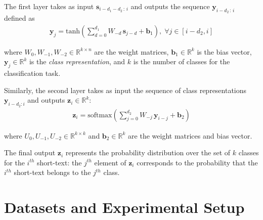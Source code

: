 \documentclass[11pt,letterpaper]{article}
\begin{document}
The first layer takes as input
$\mathbf{s}_{i-d_1-d_2 \, : \, i}$ 
and outputs the sequence
$\mathbf{y}_{i-d_2\,:\,i}$ defined as
\vspace{-0.2cm}
\begin{align*}
\mathbf{y}_j = \text{tanh} \left( \sum_{d = 0}^{d_1} W_{-d} \, \mathbf{s}_{j-d} + \mathbf{b}_1 \right), \; \forall j \in [i-d_2, i]
\end{align*}\vspace{-0.2cm}

\noindent where $W_0, W_{-1}, W_{-2} \in \mathbb{R}^{k \times n}$ are the weight matrices, 
$\mathbf{b}_1 \in \mathbb{R}^k$ is the bias vector,
$\mathbf{y}_j \in \mathbb{R}^k$ is the \textit{class representation}, 
and $k$ is the number of classes for the classification task.


Similarly, the second layer takes as input the sequence of class representations 
$\mathbf{y}_{i-d_2:i}$  
 and outputs $\mathbf{z}_i \in \mathbb{R}^k$:
 \vspace{-0.3cm}
 \begin{align*}
\mathbf{z}_i = \text{softmax} \left( \sum_{j = 0}^{d_2} W_{-j} \, \mathbf{y}_{i-j} + \mathbf{b}_2 \right) 
\end{align*}\vspace{-0.3cm}

\noindent where $U_0, U_{-1}, U_{-2} \in \mathbb{R}^{k \times k}$ and $\mathbf{b}_2 \in \mathbb{R}^k$ are the weight matrices and bias vector.

The final output $\mathbf{z}_i$ represents the probability distribution over the set of $k$ classes for the $i^{th}$ short-text: the $j^{th}$ element of $\mathbf{z}_i$ corresponds to the probability that the $i^{th}$ short-text belongs to the $j^{th}$ class.  


 
\section{Datasets and Experimental Setup}
\end{document}
